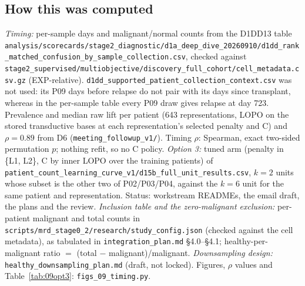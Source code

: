 \subsection*{How this was computed}
{\small\raggedright
\emph{Timing:} per-sample days and malignant/normal counts from the D1DD13 table \texttt{analysis/\allowbreak scorecards/\allowbreak stage2\_diagnostic/\allowbreak d1a\_deep\_dive\_20260910/\allowbreak d1dd\_rank\_matched\_\allowbreak confusion\_by\_\allowbreak sample\_collection.csv}, checked against \texttt{stage2\_supervised/\allowbreak multiobjective/\allowbreak discovery\_full\_cohort/\allowbreak cell\_metadata.csv.gz} (EXP-relative). \texttt{d1dd\_supported\_\allowbreak patient\_\allowbreak collection\_\allowbreak context.csv} was not used: its P09 days before relapse do not pair with its days since transplant, whereas in the per-sample table every P09 draw gives relapse at day 723. Prevalence and median raw lift per patient (643 representations, LOPO on the stored transductive bases at each representation's selected penalty and C) and $\rho = 0.89$ from D6 (\texttt{meeting\_followup\_v1/}). Timing $\rho$: Spearman, exact two-sided permutation $p$; nothing refit, so no C policy. \emph{Option 3:} tuned arm (penalty in \{L1, L2\}, C by inner LOPO over the training patients) of \texttt{patient\_count\_\allowbreak learning\_curve\_v1/\allowbreak d15b\_full\_\allowbreak unit\_results.csv}, $k = 2$ units whose subset is the other two of P02/P03/P04, against the $k = 6$ unit for the same patient and representation. Status: workstream READMEs, the email draft, the plans and the review. \emph{Inclusion table and the zero-malignant exclusion:} per-patient malignant and total counts in \texttt{scripts/\allowbreak mrd\_stage0\_2/\allowbreak research/\allowbreak study\_config.json} (checked against the cell metadata), as tabulated in \texttt{integration\_plan.md} \S4.0--\S4.1; healthy-per-malignant ratio $=$ (total $-$ malignant)/malignant. \emph{Downsampling design:} \texttt{healthy\_downsampling\_plan.md} (draft, not locked). Figures, $\rho$ values and Table~\ref{tab:09opt3}: \texttt{figs\_09\_timing.py}. \par}
